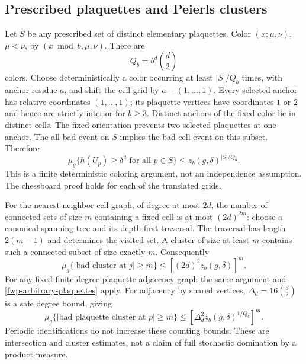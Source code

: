 \documentclass[11pt]{article}
\theoremstyle{remark}
\begin{document}
\subsection{Prescribed plaquettes and Peierls clusters}
\label{fwp-color-section}

Let \(S\) be any prescribed set of distinct elementary plaquettes.
Color \((x;\mu,\nu)\), \(\mu<\nu\), by \((x\bmod b,\mu,\nu)\).
There are
\begin{equation}
 Q_b=b^d\binom d2
 \label{fwp-color-count}
\end{equation}
colors. Choose deterministically a color occurring at least
\(|S|/Q_b\) times, with anchor residue \(a\), and shift the cell grid
by \(a-(1,\ldots,1)\). Every selected anchor has relative coordinates
\((1,\ldots,1)\); its plaquette vertices have coordinates \(1\) or \(2\)
and hence are strictly interior for \(b\ge3\).
Distinct anchors of the fixed color lie in distinct cells.
The fixed orientation prevents two selected plaquettes at one anchor.
The all-bad event on \(S\) implies the bad-cell event on this subset.
Therefore
\begin{equation}
 \mu_g\{h(U_p)\ge\delta^2\text{ for all }p\in S\}
       \le z_b(g,\delta)^{|S|/Q_b}.
 \label{fwp-arbitrary-plaquettes}
\end{equation}
This is a finite deterministic coloring argument, not an independence
assumption. The chessboard proof holds for each of the translated grids.

For the nearest-neighbor cell graph, of degree at most \(2d\), the
number of connected sets of size \(m\) containing a fixed cell is at
most \((2d)^{2m}\): choose a canonical spanning tree and its depth-first
traversal. The traversal has length \(2(m-1)\) and determines the visited
set. A cluster of size at least \(m\) contains such a connected subset
of size exactly \(m\). Consequently
\begin{equation}
 \mu_g\{|\text{bad cluster at }j|\ge m\}
       \le[(2d)^2z_b(g,\delta)]^m.
 \label{fwp-cell-cluster}
\end{equation}
For any fixed finite-degree plaquette adjacency graph the same argument
and \eqref{fwp-arbitrary-plaquettes} apply. For adjacency by shared
vertices, \(\Delta_d=16\binom d2\) is a safe degree bound, giving
\begin{equation}
 \mu_g\{|\text{bad plaquette cluster at }p|\ge m\}
       \le[\Delta_d^2z_b(g,\delta)^{1/Q_b}]^m.
 \label{fwp-plaquette-cluster}
\end{equation}
Periodic identifications do not increase these counting bounds.
These are intersection and cluster estimates, not a claim of full
stochastic domination by a product measure.
\end{document}
